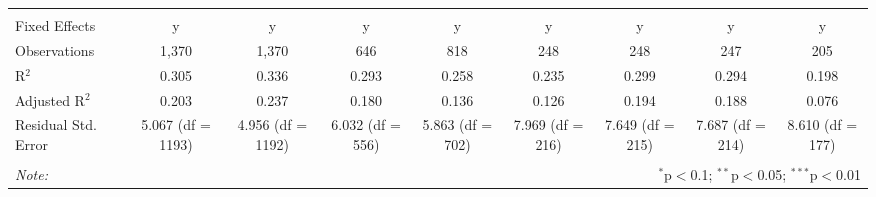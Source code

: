 \begin{table}[!htbp]
\begin{tabular}{@{\extracolsep{5pt}}lcccccccc}
  & & & & & & & & \\ 
\hline \\[-1.8ex] 
Fixed Effects & y & y & y & y & y & y & y & y \\ 
Observations & 1,370 & 1,370 & 646 & 818 & 248 & 248 & 247 & 205 \\ 
R$^{2}$ & 0.305 & 0.336 & 0.293 & 0.258 & 0.235 & 0.299 & 0.294 & 0.198 \\ 
Adjusted R$^{2}$ & 0.203 & 0.237 & 0.180 & 0.136 & 0.126 & 0.194 & 0.188 & 0.076 \\ 
Residual Std. Error & 5.067 (df = 1193) & 4.956 (df = 1192) & 6.032 (df = 556) & 5.863 (df = 702) & 7.969 (df = 216) & 7.649 (df = 215) & 7.687 (df = 214) & 8.610 (df = 177) \\ 
\hline 
\hline \\[-1.8ex] 
\textit{Note:}  & \multicolumn{8}{r}{$^{*}$p$<$0.1; $^{**}$p$<$0.05; $^{***}$p$<$0.01} \\ 
\end{tabular} 
\end{table} 
